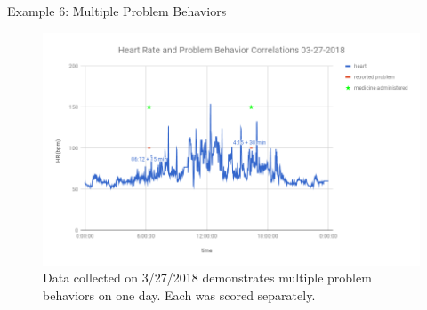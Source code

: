 \documentclass[final]{beamer}
\newlength{\onecolwid}
\newlength{\twocolwid}
\begin{document}
\begin{frame}[t]
\begin{columns}[t]
\begin{column}{\twocolwid}
\begin{columns}[t,totalwidth=\twocolwid]
\begin{column}{\onecolwid}

\begin{block}{Example 6: Multiple Problem Behaviors}
	
	\begin{figure}
		\includegraphics[width=0.8\linewidth]{Example6.png}
		\caption{Data collected on 3/27/2018 demonstrates multiple problem behaviors on one day. Each was scored separately.}
	\end{figure}
	
\end{block}


\end{column} %

\end{columns} %


\begin{columns}[t,totalwidth=\twocolwid] %

\begin{column}{\onecolwid} %


\end{column} %

\begin{column}{\onecolwid} %


\end{column} %


\end{columns}
\end{column}
\end{columns}
\end{frame}
\end{document}
